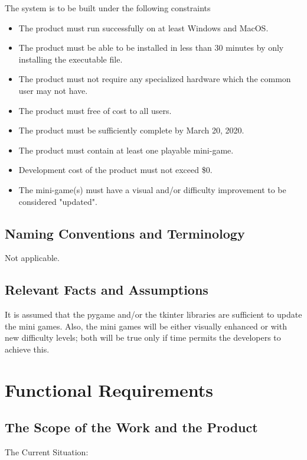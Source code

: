 \documentclass[12pt, titlepage]{article}
\begin{document}
The system is to be built under the following constraints

\begin{itemize}
    \item The product must run successfully on at least Windows and MacOS.
    \item The product must be able to be installed in less than 30 minutes by only installing the executable file.
    \item The product must not require any specialized hardware which the common user may not have.
    \item The product must free of cost to all users.
    \item The product must be sufficiently complete by March 20, 2020.
    \item The product must contain at least one playable mini-game.
    \item Development cost of the product must not exceed \$0.
    \item The mini-game(s) must have a visual and/or difficulty improvement to be considered "updated".
\end{itemize}

\subsection{Naming Conventions and Terminology}

Not applicable.

\subsection{Relevant Facts and Assumptions}

It is assumed that the pygame and/or the tkinter libraries are sufficient to update the mini games. Also, the mini games will be either visually enhanced or with new difficulty levels; both will be true only if time permits the developers to achieve this.

\section{Functional Requirements}

\subsection{The Scope of the Work and the Product}

The Current Situation:
\end{document}
